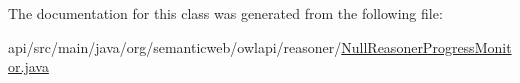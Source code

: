 The documentation for this class was generated from the following file\-:\begin{DoxyCompactItemize}
\item 
api/src/main/java/org/semanticweb/owlapi/reasoner/\hyperlink{_null_reasoner_progress_monitor_8java}{Null\-Reasoner\-Progress\-Monitor.\-java}\end{DoxyCompactItemize}
